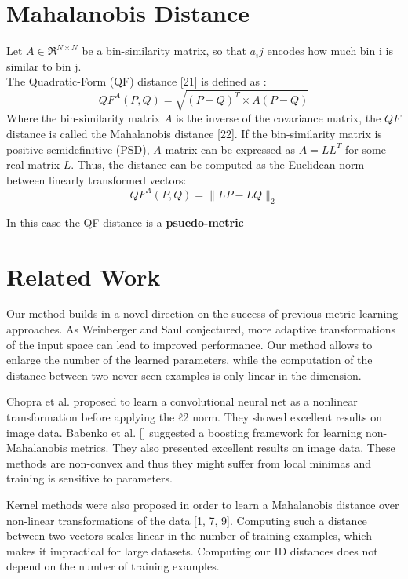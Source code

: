 \section{Mahalanobis Distance}
Let $A \in \Re^{N \times N}$ be a bin-similarity matrix, so that $a_ij$ encodes how much bin i is similar to bin j. \\
The Quadratic-Form (QF) distance [21] is defined as : 
\begin{equation}
QF^A(P, Q) = \sqrt{(P - Q)^T \times A(P - Q)}
\end{equation}
Where the bin-similarity matrix $A$ is the inverse of the covariance matrix, the $QF$ distance is called the Mahalanobis distance [22]. If the bin-similarity matrix is positive-semidefinitive (PSD), $A$ matrix can be expressed as $A = LL^T$ for some real matrix $L$. Thus, the distance can be computed as the Euclidean norm between linearly transformed vectors: 
\begin{equation}
QF^A(P, Q) = \lVert LP - LQ \rVert_2
\end{equation}


In this case the QF distance is a \textbf{psuedo-metric}


\section{Related Work}

Our method builds in a novel direction on the success of previous metric learning approaches. As Weinberger and Saul \cite{weinberger2009distance} conjectured, more adaptive transformations of the input space can lead to improved performance. Our method allows to enlarge the number of the learned parameters, while the computation of the distance between two never-seen examples is only linear in the dimension. 

Chopra et al. \cite{chopra2005learning} proposed to learn a convolutional neural net as a nonlinear transformation before applying the ℓ2 norm. They showed excellent results on image data. 
Babenko et al. [] suggested a boosting framework for learning non-Mahalanobis metrics. They also presented excellent results on image data. These methods are non-convex and thus they might suffer from local minimas and training is sensitive to parameters. 

Kernel methods were also proposed in order to learn a Mahalanobis distance over non-linear transformations of the data [1, 7, 9]. Computing such a distance between two vectors scales linear in the number of training examples, which makes it impractical for large datasets. Computing our ID distances does not depend on the number of training examples. 

